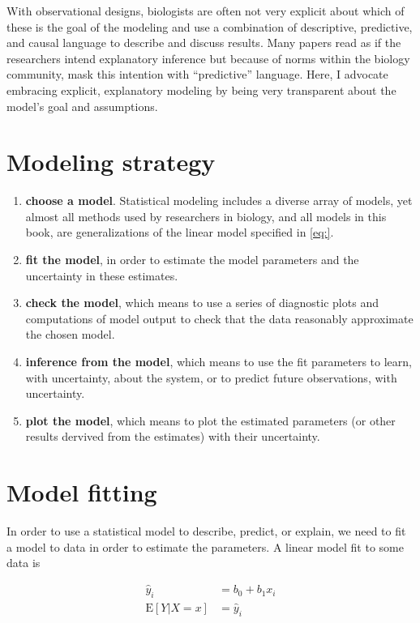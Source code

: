 \documentclass[]{book}
\begin{document}
With observational designs, biologists are often not very explicit about
which of these is the goal of the modeling and use a combination of
descriptive, predictive, and causal language to describe and discuss
results. Many papers read as if the researchers intend explanatory
inference but because of norms within the biology community, mask this
intention with ``predictive'' language. Here, I advocate embracing
explicit, explanatory modeling by being very transparent about the
model's goal and assumptions.

\section{Modeling strategy}\label{modeling-strategy}

\begin{enumerate}
\def\labelenumi{\arabic{enumi}.}
\item
  \textbf{choose a model}. Statistical modeling includes a diverse array
  of models, yet almost all methods used by researchers in biology, and
  all models in this book, are generalizations of the linear model
  specified in \ref{eq:}.
\item
  \textbf{fit the model}, in order to estimate the model parameters and
  the uncertainty in these estimates.
\item
  \textbf{check the model}, which means to use a series of diagnostic
  plots and computations of model output to check that the data
  reasonably approximate the chosen model.
\item
  \textbf{inference from the model}, which means to use the fit
  parameters to learn, with uncertainty, about the system, or to predict
  future observations, with uncertainty.
\item
  \textbf{plot the model}, which means to plot the estimated parameters
  (or other results dervived from the estimates) with their uncertainty.
\end{enumerate}

\section{Model fitting}\label{model-fitting}

In order to use a statistical model to describe, predict, or explain, we
need to fit a model to data in order to estimate the parameters. A
linear model fit to some data is

\begin{align}
\hat{y}_i &= b_0 + b_1 x_i\\
\mathrm{E}[Y|X=x] &= \hat{y}_i
\label{eq:yhat}
\end{align}
\end{document}
